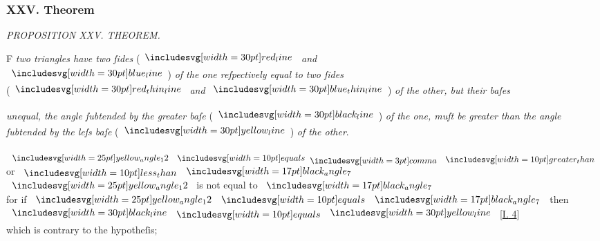 \documentclass[12pt,preview]{standalone}
\begin{document}
\subsubsection{XXV. Theorem}

\begin{minipage}[t]{0.64\textwidth}
    \vspace{0pt}

    \begin{center}
        \textit{PROPOSITION XXV. THEOREM.}\label{book1pr25} \\
    \end{center}

    \hfill

    \begin{center}
        \raggedright \lettrine[lines=4, loversize=1, nindent=0pt]{}{}F \textit{two triangles have two ſides} (\hspace{-1ex}$\redline$ \textit{and}\\ $\blueline$\hspace{-1ex}) \textit{of the one reſpectively equal to two ſides}\\ (\hspace{-1ex}$\redthinline$ \textit{and} $\bluethinline$\hspace{-1ex}) \textit{of the other, but their baſes}\\
    \end{center}
    \raggedright \textit{unequal, the angle ſubtended by the greater baſe} (\hspace{-1ex}$\blackline$\hspace{-1ex}) \textit{of the one, muſt be greater than the angle ſubtended by the leſs baſe} (\hspace{-1ex}$\yellowline$\hspace{-1ex}) \textit{of the other}.

    \hfill

    \hfill

    {\vspace{1ex}\begin{center}
            $\img{yellow_angle_12} \bequals \bcomma \bgt$ or $\blt \img[0][0][17]{black_angle_7}$\\
            $\img{yellow_angle_12}$ is not equal to $\img[0][0][17]{black_angle_7}$\\
            for if $\img{yellow_angle_12} \bequals \img[0][0][17]{black_angle_7}$ then $\blackline \bequals \yellowline$ [\hyperref[book1pr4]{\textsc{I.} 4}]\\
            which is contrary to the hypotheſis;
        \end{center}}


\end{minipage}
\end{document}
